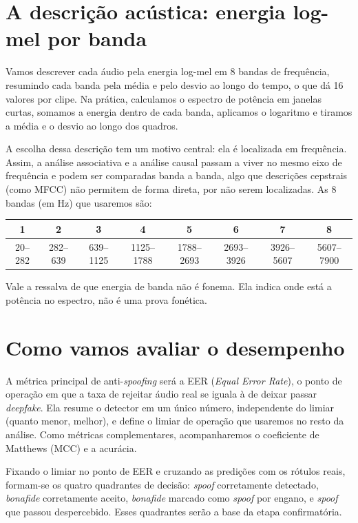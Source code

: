 \documentclass[11pt,a4paper]{article}
\begin{document}
\section{A descrição acústica: energia log-mel por banda}

Vamos descrever cada áudio pela energia log-mel em 8 bandas de frequência,
resumindo cada banda pela média e pelo desvio ao longo do tempo, o que dá 16
valores por clipe. Na prática, calculamos o espectro de potência em janelas
curtas, somamos a energia dentro de cada banda, aplicamos o logaritmo e tiramos a
média e o desvio ao longo dos quadros.

A escolha dessa descrição tem um motivo central: ela é localizada em frequência.
Assim, a análise associativa e a análise causal passam a viver no mesmo eixo de
frequência e podem ser comparadas banda a banda, algo que descrições cepstrais
(como MFCC) não permitem de forma direta, por não serem localizadas. As 8 bandas
(em Hz) que usaremos são:

\begin{center}
\small
\begin{tabular}{cccccccc}
\toprule
1 & 2 & 3 & 4 & 5 & 6 & 7 & 8 \\
\midrule
20--282 & 282--639 & 639--1125 & 1125--1788 & 1788--2693 & 2693--3926 & 3926--5607 & 5607--7900 \\
\bottomrule
\end{tabular}
\end{center}

Vale a ressalva de que energia de banda não é fonema. Ela indica onde está a
potência no espectro, não é uma prova fonética.

\section{Como vamos avaliar o desempenho}

A métrica principal de anti-\emph{spoofing} será a EER (\emph{Equal Error Rate}),
o ponto de operação em que a taxa de rejeitar áudio real se iguala à de deixar
passar \emph{deepfake}. Ela resume o detector em um único número, independente do
limiar (quanto menor, melhor), e define o limiar de operação que usaremos no resto
da análise. Como métricas complementares, acompanharemos o coeficiente de
Matthews (MCC) e a acurácia.

Fixando o limiar no ponto de EER e cruzando as predições com os rótulos reais,
formam-se os quatro quadrantes de decisão: \emph{spoof} corretamente detectado,
\emph{bonafide} corretamente aceito, \emph{bonafide} marcado como \emph{spoof} por
engano, e \emph{spoof} que passou despercebido. Esses quadrantes serão a base da
etapa confirmatória.
\end{document}
